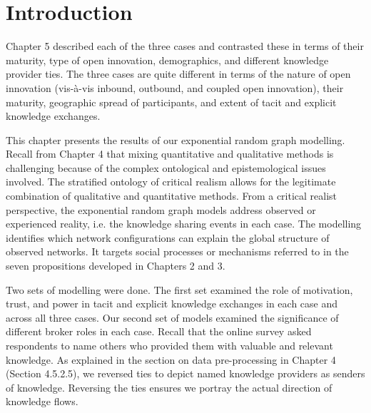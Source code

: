 \section{Introduction}

Chapter 5 described each of the three cases and contrasted these in terms of their maturity, type of open innovation, demographics, and different knowledge provider ties. The three cases are quite different in terms of the nature of open innovation (vis-\`a-vis inbound, outbound, and coupled open innovation), their maturity, geographic spread of participants, and extent of tacit and explicit knowledge exchanges. \medskip

This chapter presents the results of our exponential random graph modelling. Recall from Chapter 4 that mixing quantitative and qualitative methods is challenging because of the complex ontological and epistemological issues involved. The stratified ontology of critical realism allows for the legitimate combination of qualitative and quantitative methods. From a critical realist perspective, the exponential random graph models address observed or experienced reality, i.e. the knowledge sharing events in each case. The modelling identifies which network configurations can explain the global structure of observed networks. It targets social processes or mechanisms referred to in the seven propositions developed in Chapters 2 and 3. \medskip

Two sets of modelling were done. The first set examined the role of motivation, trust, and power in tacit and explicit knowledge exchanges in each case and across all three cases. Our second set of models examined the significance of different broker roles in each case. Recall that the online survey asked respondents to name others who provided them with valuable and relevant knowledge. As explained in the section on data pre-processing in Chapter 4 (Section 4.5.2.5), we reversed ties to depict named knowledge providers as senders of knowledge. Reversing the ties ensures we portray the actual direction of knowledge flows. \medskip

